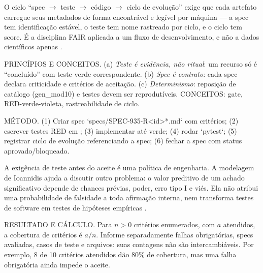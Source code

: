 O ciclo ``spec $\rightarrow$ teste $\rightarrow$ código $\rightarrow$ ciclo de evolução'' exige que cada artefato
carregue seus metadados de forma encontrável e legível por máquina — a spec
tem identificação estável, o teste tem nome rastreado por ciclo, e o ciclo tem
score. É a disciplina FAIR aplicada a um fluxo de desenvolvimento, e não a
dados científicos apenas .\begin{conceito}
PRINCÍPIOS E CONCEITOS. (a) \emph{Teste é evidência, não ritual}: um recurso só
é ``concluído'' com teste verde correspondente. (b) \emph{Spec é contrato}:
cada spec declara criticidade e critérios de aceitação. (c)
\emph{Determinismo}: reposição de catálogo (gen\_mod10) e testes devem ser
reprodutíveis. CONCEITOS: gate, RED-verde-violeta, rastreabilidade de ciclo.
\end{conceito}

\begin{metodo}
MÉTODO. (1) Criar spec `specs/SPEC-935-R<id>*.md` com critérios; (2) escrever
testes RED em ; (3) implementar até verde; (4) rodar
`pytest`; (5) registrar ciclo de evolução referenciando a spec; (6) fechar a
spec com status aprovado/bloqueado.
\end{metodo}

A exigência de teste antes do aceite é uma política de engenharia. A
modelagem de Ioannidis ajuda a discutir outro problema: o valor preditivo
de um achado significativo depende de chances prévias, poder, erro tipo I
e viés. Ela não atribui uma probabilidade de falsidade a toda afirmação
interna, nem transforma testes de software em testes de hipóteses empíricas
.
\begin{resultado}
RESULTADO E CÁLCULO. Para $n>0$ critérios enumerados, com $a$ atendidos,
a cobertura de critérios é $a/n$. Informe separadamente falhas obrigatórias,
specs avaliadas, casos de teste e arquivos: suas contagens não são
intercambiáveis. Por exemplo, 8 de 10 critérios atendidos dão 80\% de
cobertura, mas uma falha obrigatória ainda impede o aceite.
\end{resultado}

